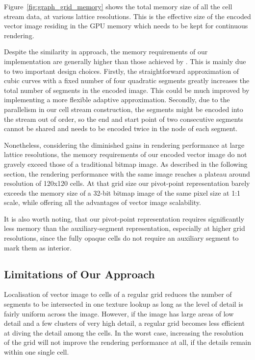 \documentclass[11pt,a4paper,twoside]{article}
\begin{document}
Figure~\ref{fig:graph_grid_memory} shows the total memory size of all the cell stream data, at various lattice resolutions. This is the effective size of the encoded vector image residing in the GPU memory which needs to be kept for continuous rendering.

Despite the similarity in approach, the memory requirements of our implementation are generally higher than those achieved by \cite{NehabHoppe08}. This is mainly due to two important design choices. Firstly, the straightforward approximation of cubic curves with a fixed number of four quadratic segments greatly increases the total number of segments in the encoded image. This could be much improved by implementing a more flexible adaptive approximation. Secondly, due to the parallelism in our cell stream construction, the segments might be encoded into the stream out of order, so the end and start point of two consecutive segments cannot be shared and needs to be encoded twice in the node of each segment.

Nonetheless, considering the diminished gains in rendering performance at large lattice resolutions, the memory requirements of our encoded vector image do not gravely exceed those of a traditional bitmap image. As described in the following section, the rendering performance with the same image reaches a plateau around resolution of 120x120 cells. At that grid size our pivot-point representation barely exceeds the memory size of a 32-bit bitmap image of the same pixel size at 1:1 scale, while offering all the advantages of vector image scalability.

It is also worth noting, that our pivot-point representation requires significantly less memory than the auxiliary-segment representation, especially at higher grid resolutions, since the fully opaque cells do not require an auxiliary segment to mark them as interior.


\subsection {Limitations of Our Approach}

Localisation of vector image to cells of a regular grid reduces the number of segments to be intersected in one texture lookup as long as the level of detail is fairly uniform across the image. However, if the image has large areas of low detail and a few clusters of very high detail, a regular grid becomes less efficient at diving the detail among the cells. In the worst case, increasing the resolution of the grid will not improve the rendering performance at all, if the details remain within one single cell.
\end{document}
